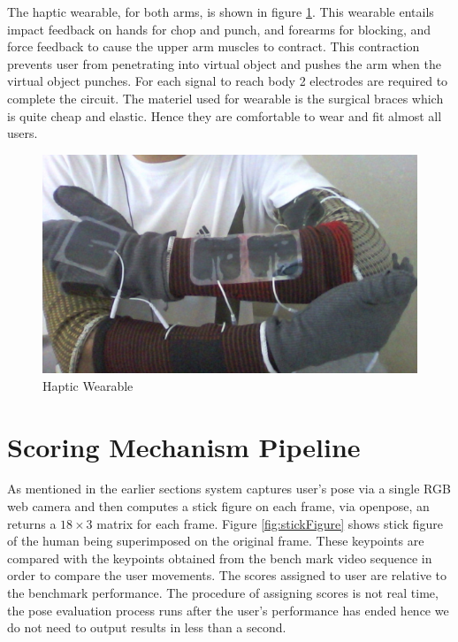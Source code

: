 The haptic wearable, for both arms, is shown in figure \ref{fig:wearable}. This wearable entails impact feedback on hands for chop and punch, and forearms for blocking, and force feedback to cause the upper arm muscles to contract. This contraction prevents user from penetrating into virtual object and pushes the arm when the virtual object punches. For each signal to reach body 2 electrodes are required to complete the circuit. The materiel used for wearable is the surgical braces which is quite cheap and elastic. Hence they are comfortable to wear and fit almost all users. 

\begin{figure}
    \centering
    \includegraphics{images/haptics/wearable.PNG}
    \caption{Haptic Wearable}
    \label{fig:wearable}
\end{figure}

\section{Scoring Mechanism Pipeline}

As mentioned in the earlier sections system captures user's pose via a single RGB web camera and then computes a stick figure on each frame, via openpose, an returns a $18 \times 3$ matrix for each frame. Figure \ref{fig:stickFigure} shows stick figure of the human being superimposed on the original frame. These keypoints are compared with the keypoints obtained from the bench mark video sequence in order to compare the user movements. The scores assigned to user are relative to the benchmark performance. The procedure of assigning scores is not real time, the pose evaluation process runs after the user's performance has ended hence we do not need to output results in less than a second. 

